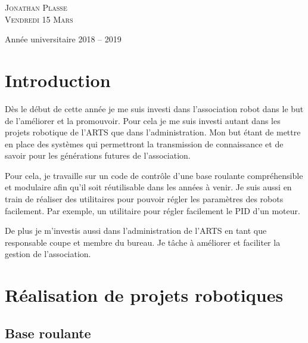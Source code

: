 \documentclass[11pt,a4paper]{report}
\begin{document}
\begin{titlepage}
\begin{sffamily}
\begin{center}
      \textsc{\Large Jonathan Plasse}\\[1cm]

      \textsc{\large Vendredi 15 Mars}



      \vfill

      {\large Année universitaire 2018 -- 2019}

    \end{center}
  \end{sffamily}
\end{titlepage}

\renewcommand{\thepage}{\roman{page}}

\tableofcontents %



\chapter*{Introduction}
  \renewcommand{\thepage}{\arabic{page}}
  \setcounter{page}{1}

  Dès le début de cette année je me suis investi dans l'association robot dans le but de l'améliorer et la promouvoir.
  Pour cela je me suis investi autant dans les projets robotique de l'ARTS que dans l'administration.
  Mon but étant de mettre en place des systèmes qui permettront la transmission de connaissance et de savoir pour les générations futures de l'association.

  Pour cela, je travaille sur un code de contr\^ole d'une base roulante compréhensible et modulaire afin qu'il soit réutilisable dans les années à venir.
  Je suis aussi en train de réaliser des utilitaires pour pouvoir régler les paramètres des robots facilement. Par exemple, un utilitaire pour régler facilement le PID d'un moteur.

  De plus je m'investis aussi dans l'administration de l'ARTS en tant que responsable coupe et membre du bureau. Je t\^ache à améliorer et faciliter la gestion de l'association.

\chapter{Réalisation de projets robotiques}


  \section{Base roulante}
\end{document}
